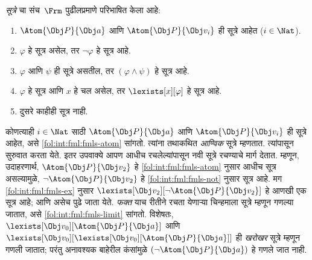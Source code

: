 \begin{defn}
\emph{सूत्रे} चा संच~$\Frm$ पुढीलप्रमाणे परिभाषित केला आहे:
\begin{enumerate}
\item\label{fol:int:fml:fmls-atom} $\Atom{\Obj P}{\Obj a}$ आणि $\Atom{\Obj
  P}{\Obj v_i}$ ही सूत्रे आहेत ($i \in \Nat$).

\item \label{fol:int:fml:fmls-not}$\varphi$ हे सूत्र असेल, तर $\lnot \varphi$ हे
  सूत्र आहे.

\item $\varphi$ आणि $\psi$ ही सूत्रे असतील, तर $(\varphi \land
  \psi)$ हे सूत्र आहे.

\item \label{fol:int:fml:fmls-ex}$\varphi$ हे सूत्र आणि $x$ हे चल
  असेल, तर $\lexists[x][\varphi]$ हे सूत्र आहे.

\item \label{fol:int:fml:fmls-limit}दुसरे काहीही सूत्र नाही.
\end{enumerate}
\end{defn}

कोणत्याही $i \in \Nat$ साठी $\Atom{\Obj P}{\Obj a}$ आणि
$\Atom{\Obj P}{\Obj v_i}$ ही सूत्रे आहेत, असे
\ref{fol:int:fml:fmls-atom} सांगतो. त्यांना तथाकथित \emph{आण्विक} सूत्रे
म्हणतात. त्यांपासून सुरुवात करता येते. इतर उपवाक्ये आपण आधीच
रचलेल्यांपासून नवी सूत्रे रचण्याचे मार्ग देतात. म्हणून,
उदाहरणार्थ, $\Atom{\Obj P}{\Obj v_2}$ हे \ref{fol:int:fml:fmls-atom} नुसार आधीच
सूत्र असल्यामुळे, $\lnot \Atom{\Obj P}{\Obj v_2}$ हे
\ref{fol:int:fml:fmls-not} नुसार सूत्र आहे. मग
\ref{fol:int:fml:fmls-ex} नुसार $\lexists[\Obj v_2][\lnot \Atom{\Obj P}{\Obj
v_2}]$ हे आणखी एक सूत्र आहे; आणि असेच पुढे जाता येते. \emph{फक्त} याच
रीतीने रचता येणाऱ्या चिन्हमाला सूत्रे म्हणून गणल्या जातात, असे
\ref{fol:int:fml:fmls-limit} सांगतो. विशेषतः,
$\lexists[\Obj v_0][\Atom{\Obj P}{\Obj a}]$ आणि $\lexists[\Obj
  v_0][\lexists[\Obj v_0][\Atom{\Obj P}{\Obj a}]]$ ही
\emph{खरोखर} सूत्रे म्हणून गणली जातात; परंतु अनावश्यक बाहेरील
कंसांमुळे $(\lnot \Atom{\Obj P}{\Obj a})$ हे गणले जात नाही.

